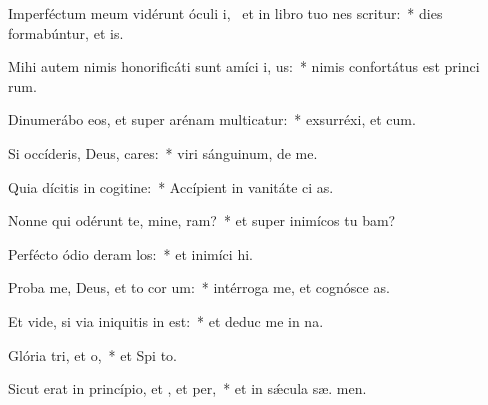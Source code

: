 \item Imperféctum meum vidérunt óculi i,~\pscross{} et in libro tuo nes scritur:~* dies formabúntur, et   is.
\item Mihi autem nimis honorificáti sunt amíci i, us:~* nimis confortátus est princi rum.
\item Dinumerábo eos, et super arénam multicatur:~* exsurréxi, et   cum.
\item Si occíderis, Deus, cares:~* viri sánguinum, de  me.
\item Quia dícitis in cogitine:~* Accípient in vanitáte ci as.
\item Nonne qui odérunt te, mine, ram?~* et super inimícos tu bam?
\item Perfécto ódio deram los:~* et inimíci   hi.
\item Proba me, Deus, et to cor um:~* intérroga me, et cognósce  as.
\item Et vide, si via iniquitis in  est:~* et deduc me in  na.
\item Glória tri, et o,~* et Spi to.
\item Sicut erat in princípio, et , et per,~* et in sǽcula sæ. men.
